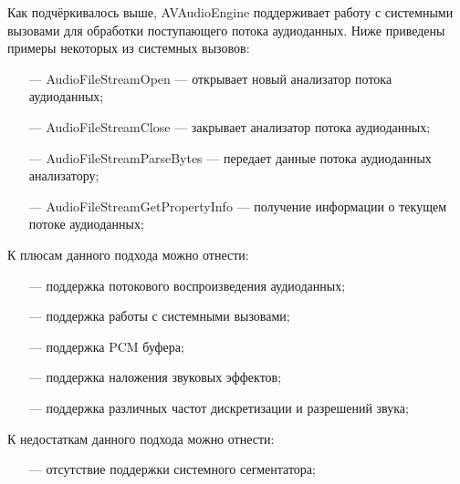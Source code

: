 		\par Как подчёркивалось выше, AVAudioEngine поддерживает работу с системными вызовами 
		для обработки поступающего потока аудиоданных. Ниже приведены примеры некоторых из системных вызовов:
		\begin{itemize}
			\item[---] AudioFileStreamOpen --- открывает новый анализатор потока аудиоданных;
			\item[---] AudioFileStreamClose --- закрывает анализатор потока аудиоданных;
			\item[---] AudioFileStreamParseBytes --- передает данные потока аудиоданных анализатору;
			\item[---] AudioFileStreamGetPropertyInfo --- получение информации о текущем потоке аудиоданных; 
		\end{itemize}

		\par К плюсам данного подхода можно отнести:
		\begin{itemize}
			\item[---] поддержка потокового воспроизведения аудиоданных;
			\item[---] поддержка работы с системными вызовами;
			\item[---] поддержка PCM буфера; 
			\item[---] поддержка наложения звуковых эффектов;
			\item[---] поддержка различных частот дискретизации и разрешений звука;
		\end{itemize}

		\par К недостаткам данного подхода можно отнести:
		\begin{itemize}
			\item[---] отсутствие поддержки системного сегментатора;
		\end{itemize}

